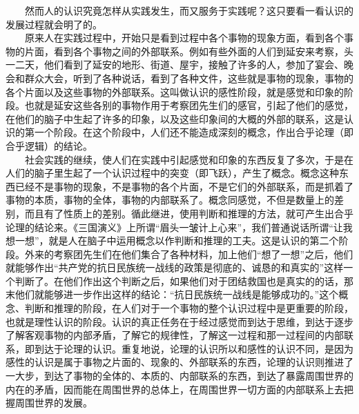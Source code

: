 \documentclass[cn,11pt,chinese]{elegantbook}
\begin{document}
　　然而人的认识究竟怎样从实践发生，而又服务于实践呢？这只要看一看认识的发展过程就会明了的。\\
　　原来人在实践过程中，开始只是看到过程中各个事物的现象方面，看到各个事物的片面，看到各个事物之间的外部联系。例如有些外面的人们到延安来考察，头一二天，他们看到了延安的地形、街道、屋宇，接触了许多的人，参加了宴会、晚会和群众大会，听到了各种说话，看到了各种文件，这些就是事物的现象，事物的各个片面以及这些事物的外部联系。这叫做认识的感性阶段，就是感觉和印象的阶段。也就是延安这些各别的事物作用于考察团先生们的感官，引起了他们的感觉，在他们的脑子中生起了许多的印象，以及这些印象间的大概的外部的联系，这是认识的第一个阶段。在这个阶段中，人们还不能造成深刻的概念，作出合乎论理（即合乎逻辑）的结论。\\
　　社会实践的继续，使人们在实践中引起感觉和印象的东西反复了多次，于是在人们的脑子里生起了一个认识过程中的突变（即飞跃），产生了概念。概念这种东西已经不是事物的现象，不是事物的各个片面，不是它们的外部联系，而是抓着了事物的本质，事物的全体，事物的内部联系了。概念同感觉，不但是数量上的差别，而且有了性质上的差别。循此继进，使用判断和推理的方法，就可产生出合乎论理的结论来。《三国演义》上所谓“眉头一皱计上心来”，我们普通说话所谓“让我想一想”，就是人在脑子中运用概念以作判断和推理的工夫。这是认识的第二个阶段。外来的考察团先生们在他们集合了各种材料，加上他们“想了一想”之后，他们就能够作出“共产党的抗日民族统一战线的政策是彻底的、诚恳的和真实的”这样一个判断了。在他们作出这个判断之后，如果他们对于团结救国也是真实的的话，那末他们就能够进一步作出这样的结论：“抗日民族统一战线是能够成功的。”这个概念、判断和推理的阶段，在人们对于一个事物的整个认识过程中是更重要的阶段，也就是理性认识的阶段。认识的真正任务在于经过感觉而到达于思维，到达于逐步了解客观事物的内部矛盾，了解它的规律性，了解这一过程和那一过程间的内部联系，即到达于论理的认识。重复地说，论理的认识所以和感性的认识不同，是因为感性的认识是属于事物之片面的、现象的、外部联系的东西，论理的认识则推进了一大步，到达了事物的全体的、本质的、内部联系的东西，到达了暴露周围世界的内在的矛盾，因而能在周围世界的总体上，在周围世界一切方面的内部联系上去把握周围世界的发展。\\
\end{document}
